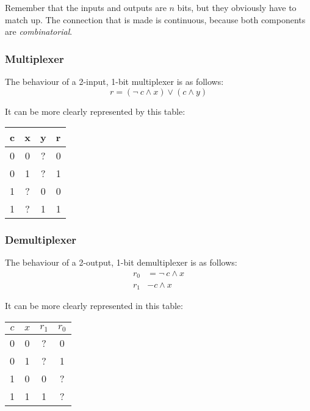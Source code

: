 \documentclass[11pt,a4paper,titlepage,dvipsnames,cmyk]{scrartcl}
\begin{document}
Remember that the inputs and outputs are $n$ bits, but they obviously have
to match up. The connection that is made is continuous, because both
components are \textit{combinatorial}.

\subsubsection{Multiplexer}%
\label{ssub:Multiplexer}
The behaviour of a 2-input, 1-bit multiplexer is as follows:
\begin{equation*}
    r = (\neg \ c \wedge x) \vee (c \wedge y)
\end{equation*}

It can be more clearly represented by this table:
\begin{center}
    \begin{tabular}{|c c c|c|}
        \hline
        c & x & y & r \\
        \hline
        0 & 0 & ? & 0 \\ \hline
        0 & 1 & ? & 1 \\ \hline
        1 & ? & 0 & 0 \\ \hline
        1 & ? & 1 & 1 \\ \hline
    \end{tabular}
\end{center}


\subsubsection{Demultiplexer}%
\label{ssub:Demultiplexer}

The behaviour of a 2-output, 1-bit demultiplexer is as follows:
\begin{align*}
    r_0 &= \neg \ c \wedge x \\
    r_1 &- c \wedge x
\end{align*}

It can be more clearly represented in this table:
\begin{center}
    \begin{tabular}{|c c|c c|}
        \hline
        $c$ & $x$ & $r_1$ & $r_0$ \\ \hline
        0 & 0 & ? & 0 \\ \hline
        0 & 1 & ? & 1 \\ \hline
        1 & 0 & 0 & ? \\ \hline
        1 & 1 & 1 & ? \\ \hline
    \end{tabular}
\end{center}
\end{document}

